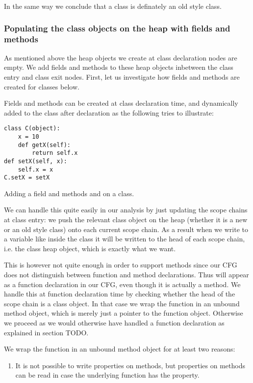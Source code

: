In the same way we conclude that a class is definately an old style class.

\subsubsection{Populating the class objects on the heap with fields and methods}
As mentioned above the heap objects we create at class declaration nodes are empty. We add fields and methods to these heap objects inbetween the class entry and class exit nodes. First, let us investigate how fields and methods are created for classes below.

Fields and methods can be created at class declaration time, and dynamically added to the class after declaration as the following tries to illustrate:

\begin{listing}[H]
	\begin{verbatim}
class C(object):
	x = 10
	def getX(self):
		return self.x
def setX(self, x):
	self.x = x
C.setX = setX
	\end{verbatim}
	\caption{Adding a field  and methods  and  on a class.}\label{code:FieldAndMethodOnClass}
\end{listing}

We can handle this quite easily in our analysis by just updating the scope chains at class entry: we push the relevant class object on the heap (whether it is a new or an old style class) onto each current scope chain. As a result when we write to a variable like  inside the class it will be written to the head of each scope chain, i.e. the class heap object, which is exactly what we want.

This is however not quite enough in order to support methods since our CFG does not distinguish between function and method declarations. Thus  will appear as a function declaration in our CFG, even though it is actually a method. We handle this at function declaration time by checking whether the head of the scope chain is a class object. In that case we wrap the function in an unbound method object, which is merely just a pointer to the function object. Otherwise we proceed as we would otherwise have handled a function declaration as explained in section TODO.

We wrap the function in an unbound method object for at least two reasons:

\begin{enumerate}
	\item It is not possible to write properties on methods, but properties on methods can be read in case the underlying function has the property.
\end{enumerate}

